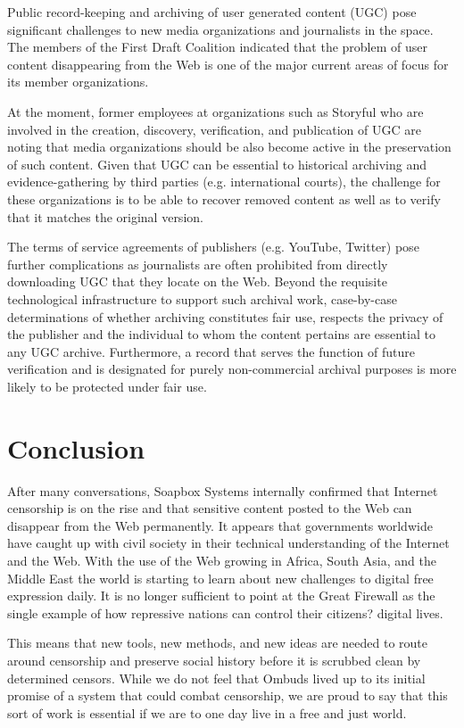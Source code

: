 \documentclass[a4paper]{article}
\begin{document}
Public record-keeping and archiving of user generated content (UGC) pose significant challenges to new media organizations and journalists in the space. The members of the First Draft Coalition indicated that the problem of user content disappearing from the Web is one of the major current areas of focus for its member organizations. \par

At the moment, former employees at organizations such as Storyful who are involved in the creation, discovery, verification, and publication of UGC are noting that media organizations should be also become active in the preservation of such content. Given that UGC can be essential to historical archiving and evidence-gathering by third parties (e.g. international courts), the challenge for these organizations is to be able to recover removed content as well as to verify that it matches the original version.\par

The terms of service agreements of publishers (e.g. YouTube, Twitter) pose further complications as journalists are often prohibited from directly downloading UGC that they locate on the Web. Beyond the requisite technological infrastructure to support such archival work, case-by-case determinations of whether archiving constitutes fair use, respects the privacy of the publisher and the individual to whom the content pertains are essential to any UGC archive. Furthermore, a record that serves the function of future verification and is designated for purely non-commercial archival purposes is more likely to be protected under fair use.\par

\section{Conclusion}
	After many conversations, Soapbox Systems internally confirmed that Internet censorship is on the rise and that sensitive content posted to the Web can disappear from the Web permanently. It appears that governments worldwide have caught up with civil society in their technical understanding of the Internet and the Web. With the use of the Web growing in Africa, South Asia, and the Middle East the world is starting to learn about new challenges to digital free expression daily. It is no longer sufficient to point at the Great Firewall as the single example of how repressive nations can control their citizens? digital lives.\par
	This means that new tools, new methods, and new ideas are needed to route around censorship and preserve social history before it is scrubbed clean by determined censors. While we do not feel that Ombuds lived up to its initial promise of a system that could combat censorship, we are proud to say that this sort of work is essential if we are to one day live in a free and just world.\par
\end{document}
